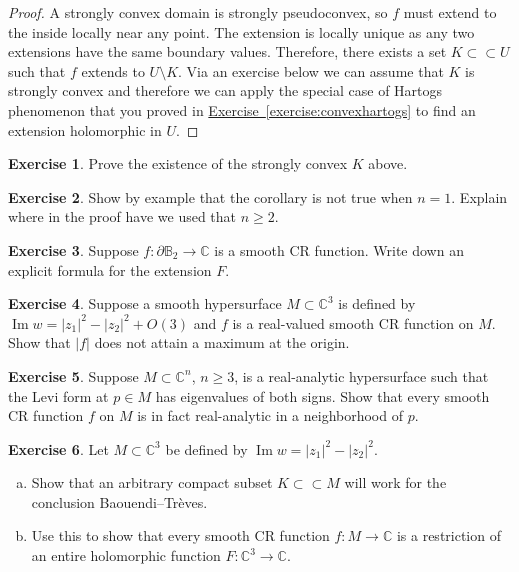 \documentclass[12pt,openany]{book}
\renewcommand{\Im}{\operatorname{Im}}
\newcommand{\sabs}[1]{\lvert {#1} \rvert}
\newcommand{\C}{{\mathbb{C}}}
\newcommand{\bB}{{\mathbb{B}}}
\theoremstyle{plain}
\theoremstyle{remark}
\theoremstyle{definition}
\newenvironment{exbox}{%
    \def\FrameCommand{\vrule width 1pt \relax\hspace {10pt}}%
    \MakeFramed {\advance \hsize -\width \FrameRestore }%
}{%
    \endMakeFramed
}
\newenvironment{exparts}{%
    \leavevmode\begin{enumerate}[a),noitemsep,topsep=0pt,parsep=0pt,partopsep=0pt]
}{%
    \end{enumerate}
}
\theoremstyle{exercise}
\newtheorem{exercise}{Exercise}[section]
\theoremstyle{example}
\newcommand{\exerciseref}[1]{\hyperref[#1]{Exercise~\ref*{#1}}}
\begin{document}
\begin{proof}
A strongly convex domain is strongly pseudoconvex, so $f$ must extend to the
inside locally near any point.  The extension is locally unique as any two
extensions have the same boundary values.  Therefore, there exists a set
$K \subset \subset U$ such that $f$ extends to $U \setminus K$.
Via an exercise below we can assume that $K$ is strongly convex and
therefore we can apply the special case of Hartogs phenomenon
that you proved in \exerciseref{exercise:convexhartogs} to find an
extension holomorphic in $U$.
\end{proof}

\begin{exbox}
\begin{exercise}
Prove the existence of the strongly convex $K$ above.
\end{exercise}

\begin{exercise}
Show by example that the corollary is not true when $n=1$.  Explain where in
the proof have we used that $n \geq 2$.
\end{exercise}

\begin{exercise}
Suppose $f \colon \partial \bB_2 \to \C$ is a smooth CR function.
Write down an explicit formula for the extension $F$.
\end{exercise}

\begin{exercise}
Suppose a smooth hypersurface $M \subset \C^3$ is defined by $\Im w = \sabs{z_1}^2-\sabs{z_2}^2 + O(3)$
and $f$ is a real-valued smooth CR function on $M$.  Show
that $\sabs{f}$ does not attain a maximum at the origin.
\end{exercise}

\begin{exercise}
Suppose $M \subset \C^n$, $n \geq 3$, is a real-analytic hypersurface
such that the Levi form at $p \in M$ has eigenvalues of both signs.
Show that every smooth CR function $f$ on $M$ is in fact real-analytic in
a neighborhood of $p$.
\end{exercise}

\begin{exercise}
Let $M \subset \C^3$ be defined by $\Im w = \sabs{z_1}^2-\sabs{z_2}^2$.
\begin{exparts}
\item
Show that an arbitrary compact subset $K \subset \subset M$ will work
for the conclusion Baouendi--Tr{\`e}ves.
\item
Use this to show that every
smooth CR function $f \colon M \to \C$ is a restriction of an entire holomorphic function
$F \colon \C^3 \to \C$.
\end{exparts}
\end{exercise}


\end{exbox}
\end{document}

